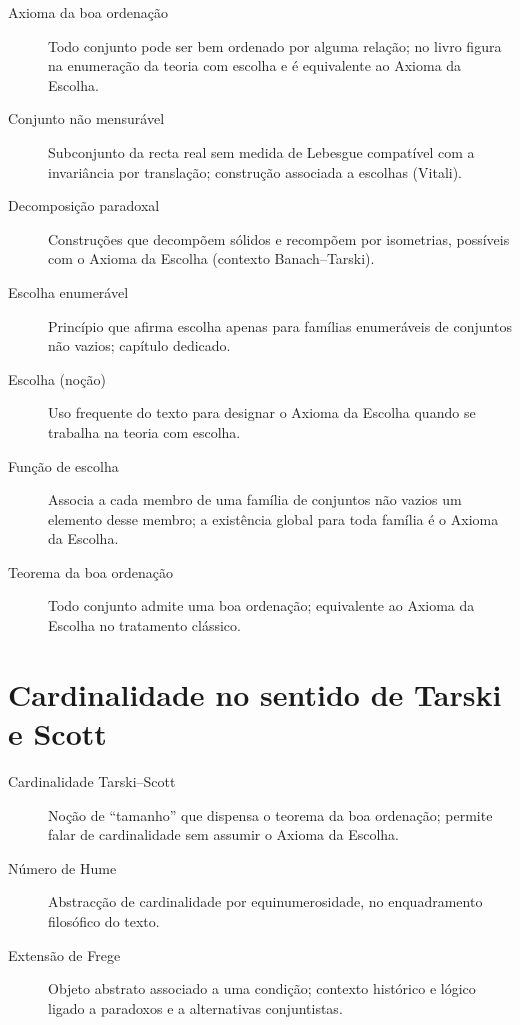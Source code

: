 \begin{description}
\item[Axioma da boa ordenação] Todo conjunto pode ser bem ordenado por alguma relação; no livro figura na enumeração da teoria com escolha e é equivalente ao Axioma da Escolha.
\item[Conjunto não mensurável] Subconjunto da recta real sem medida de Lebesgue compatível com a invariância por translação; construção associada a escolhas (Vitali).
\item[Decomposição paradoxal] Construções que decompõem sólidos e recompõem por isometrias, possíveis com o Axioma da Escolha (contexto Banach--Tarski).
\item[Escolha enumerável] Princípio que afirma escolha apenas para famílias enumeráveis de conjuntos não vazios; capítulo dedicado.
\item[Escolha (noção)] Uso frequente do texto para designar o Axioma da Escolha quando se trabalha na teoria com escolha.
\item[Função de escolha] Associa a cada membro de uma família de conjuntos não vazios um elemento desse membro; a existência global para toda família é o Axioma da Escolha.
\item[Teorema da boa ordenação] Todo conjunto admite uma boa ordenação; equivalente ao Axioma da Escolha no tratamento clássico.
\end{description}

\section*{Cardinalidade no sentido de Tarski e Scott}

\begin{description}
\item[Cardinalidade Tarski--Scott] Noção de ``tamanho'' que dispensa o teorema da boa ordenação; permite falar de cardinalidade sem assumir o Axioma da Escolha.
\item[Número de Hume] Abstracção de cardinalidade por equinumerosidade, no enquadramento filosófico do texto.
\item[Extensão de Frege] Objeto abstrato associado a uma condição; contexto histórico e lógico ligado a paradoxos e a alternativas conjuntistas.
\end{description}
